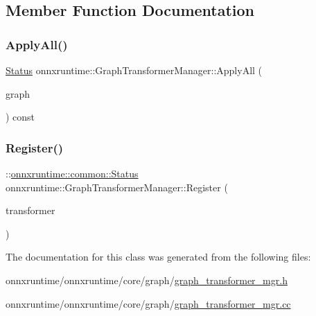 \subsection{Member Function Documentation}
\mbox{\label{classonnxruntime_1_1GraphTransformerManager_aaf5d2cf85d054f40d119bd45247f119d}} 
\subsubsection{\texorpdfstring{Apply\+All()}{ApplyAll()}}
{\footnotesize\ttfamily \mbox{\hyperlink{classonnxruntime_1_1common_1_1Status}{Status}} onnxruntime\+::\+Graph\+Transformer\+Manager\+::\+Apply\+All (\begin{DoxyParamCaption}\item[{\mbox{\hyperlink{classonnxruntime_1_1Graph}{Graph}} \&}]{graph }\end{DoxyParamCaption}) const}

\mbox{\label{classonnxruntime_1_1GraphTransformerManager_add72b4fffb313a7a6433d14786f8ab1d}} 
\subsubsection{\texorpdfstring{Register()}{Register()}}
{\footnotesize\ttfamily \+::\mbox{\hyperlink{classonnxruntime_1_1common_1_1Status}{onnxruntime\+::common\+::\+Status}} onnxruntime\+::\+Graph\+Transformer\+Manager\+::\+Register (\begin{DoxyParamCaption}\item[{std\+::unique\+\_\+ptr$<$ \mbox{\hyperlink{classonnxruntime_1_1GraphTransformer}{Graph\+Transformer}} $>$}]{transformer }\end{DoxyParamCaption})\hspace{0.3cm}{\ttfamily [inline]}}



The documentation for this class was generated from the following files\+:\begin{DoxyCompactItemize}
\item 
onnxruntime/onnxruntime/core/graph/\mbox{\hyperlink{graph__transformer__mgr_8h}{graph\+\_\+transformer\+\_\+mgr.\+h}}\item 
onnxruntime/onnxruntime/core/graph/\mbox{\hyperlink{graph__transformer__mgr_8cc}{graph\+\_\+transformer\+\_\+mgr.\+cc}}\end{DoxyCompactItemize}
